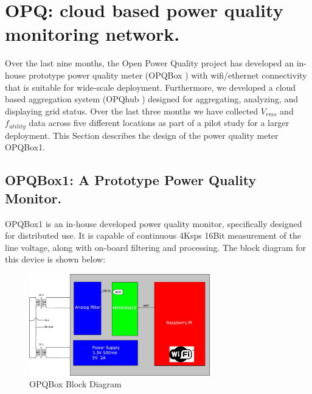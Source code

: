 \section{OPQ: cloud based power quality monitoring network.}

Over the last nine months, the Open Power Quality project \cite{OPQ} has developed an in-house prototype power quality meter (OPQBox \cite{OPQBox1Repository}) with wifi/ethernet connectivity that is suitable for wide-scale deployment. Furthermore, we developed a cloud based aggregation system (OPQhub \cite{OPQHubRepository}) designed for aggregating, analyzing, and displaying grid status. Over the last three months we have collected $V_{rms}$ and $f_{utility}$ data across five different locations as part of a pilot study for a larger deployment. This Section describes the design of the power quality meter OPQBox1.

\subsection{OPQBox1: A Prototype Power Quality Monitor.}

OPQBox1 is an in-house developed power quality monitor, specifically designed for distributed use. It is capable of continuous 4Ksps 16Bit measurement of the line voltage, along with
on-board filtering and processing. The block diagram for this device is shown below:

\begin{figure}[h!]
\centering
\includegraphics[width=0.7\textwidth]{img/OHM1Block.eps}
\caption{OPQBox Block Diagram}
\end{figure}

